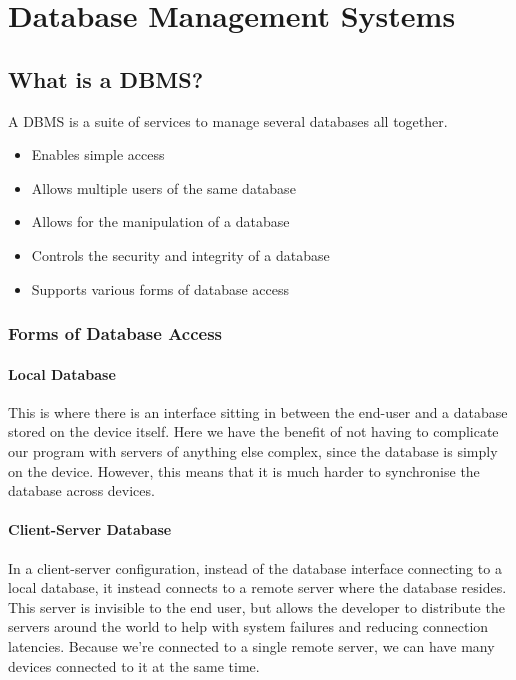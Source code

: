 \section{Database Management Systems}\label{sec:database_management_systems}

\subsection{What is a DBMS?}\label{sub:what_is_a_dbms_}

A DBMS is a suite of services to manage several databases all together.
\begin{itemize}
    \item Enables simple access
    \item Allows multiple users of the same database
    \item Allows for the manipulation of a database
    \item Controls the security and integrity of a database
    \item Supports various forms of database access
\end{itemize}

\subsubsection{Forms of Database Access}\label{ssub:forms_of_database_access}

\paragraph{Local Database}\label{par:local_interface_database}

This is where there is an interface sitting in between the end-user and a database stored on the device itself.
Here we have the benefit of not having to complicate our program with servers of anything else complex, since the database is simply on the device.
However, this means that it is much harder to synchronise the database across devices.

\paragraph{Client-Server Database}\label{par:client_server_database}

In a client-server configuration, instead of the database interface connecting to a local database, it instead connects to a remote server where the database resides.
This server is invisible to the end user, but allows the developer to distribute the servers around the world to help with system failures and reducing connection latencies.
Because we're connected to a single remote server, we can have many devices connected to it at the same time.


